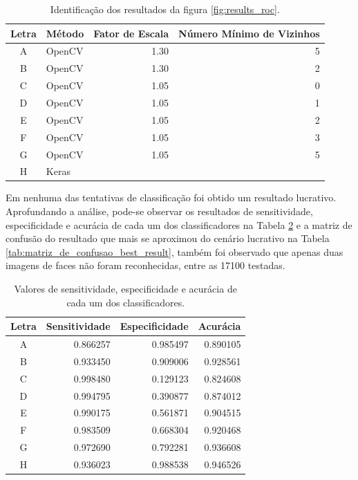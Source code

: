  \begin{table}[htbp]
     \caption{Identificação dos resultados da figura \ref{fig:results_roc}.}
     \label{tab:results_identify}
     \centering
     \begin{tabular}{clrr}
      Letra & Método & Fator de Escala & Número Mínimo de Vizinhos \\
      \midrule
           A & OpenCV & 1.30 & 5 \\
           B & OpenCV & 1.30 & 2 \\
           C & OpenCV & 1.05 & 0 \\
           D & OpenCV & 1.05 & 1 \\
           E & OpenCV & 1.05 & 2 \\
           F & OpenCV & 1.05 & 3 \\
           G & OpenCV & 1.05 & 5 \\
           H & Keras & & \\
      \end{tabular}
 \end{table}

Em nenhuma das tentativas de classificação foi obtido um resultado lucrativo. Aprofundando a análise, pode-se observar os resultados de sensitividade, especificidade e acurácia de cada um dos classificadores na Tabela \ref{tab:results_data} e a matriz de confusão do resultado que mais se aproximou do cenário lucrativo na Tabela \ref{tab:matriz_de_confusao_best_result}, também foi observado que apenas duas imagens de faces não foram reconhecidas, entre as 17100 testadas.

\begin{table}[htbp]
     \caption{Valores de sensitividade, especificidade e acurácia de cada um dos classificadores.}
     \label{tab:results_data}
     \centering
     \begin{tabular}{crrr}
      Letra & Sensitividade & Especificidade & Acurácia \\
      \midrule
           A & 0.866257 & 0.985497 & 0.890105 \\
           B & 0.933450 & 0.909006 & 0.928561 \\
           C & 0.998480 & 0.129123 & 0.824608 \\
           D & 0.994795 & 0.390877 & 0.874012 \\
           E & 0.990175 & 0.561871 & 0.904515 \\
           F & 0.983509 & 0.668304 & 0.920468 \\
           G & 0.972690 & 0.792281 & 0.936608 \\
           H & 0.936023 & 0.988538 & 0.946526 \\
      \end{tabular}
 \end{table}

